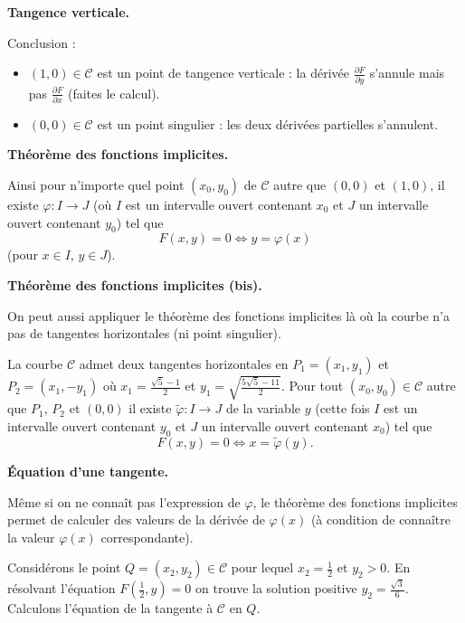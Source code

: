 \documentclass[11pt, class=report,crop=false]{standalone}
\begin{document}
\bigskip

\textbf{Tangence verticale.}

Conclusion :
\begin{itemize}
     \item $(1,0) \in \mathcal{C}$ est un point de tangence verticale : la dérivée $\frac{\partial F}{\partial y}$ s'annule mais pas  $\frac{\partial F}{\partial x}$ (faites le calcul).
     
     \item $(0,0) \in \mathcal{C}$ est un point singulier : les deux dérivées partielles s'annulent.
\end{itemize}

\bigskip


\textbf{Théorème des fonctions implicites.}

Ainsi pour n'importe quel point $(x_0,y_0)$ de $\mathcal{C}$ autre que $(0,0)$ et $(1,0)$, il existe $\varphi :I \to J$ (où $I$ est un intervalle ouvert contenant $x_0$ et $J$ un intervalle ouvert contenant $y_0$) tel que 
$$F(x,y) = 0 \iff y = \varphi(x)$$
(pour $x \in I$, $y \in J$).


\bigskip

\textbf{Théorème des fonctions implicites (bis).}

On peut aussi appliquer le théorème des fonctions implicites là où la courbe n'a pas de tangentes horizontales (ni point singulier).

La courbe $\mathcal{C}$ admet deux tangentes horizontales en $P_1=(x_1,y_1)$ et $P_2=(x_1,-y_1)$ où $x_1 = \frac{\sqrt5-1}{2}$ et $y_1 = \sqrt{\frac{5\sqrt{5}-11}{2}}$.
Pour tout $(x_0,y_0) \in \mathcal{C}$ autre que $P_1$, $P_2$ et $(0,0)$ il existe $\tilde\varphi :I \to J$ de la variable $y$ (cette fois $I$ est un intervalle ouvert contenant $y_0$ et $J$ un intervalle ouvert contenant $x_0$)  tel que 
$$F(x,y) = 0 \iff x = \tilde\varphi(y).$$


\bigskip

\textbf{\'Equation d'une tangente.}
  
Même si on ne connaît pas l'expression de $\varphi$, le théorème des fonctions implicites permet de calculer des valeurs de la dérivée de $\varphi(x)$ (à condition de connaître la valeur $\varphi(x)$ correspondante).

Considérons le point $Q=(x_2,y_2) \in \mathcal{C}$ pour lequel $x_2 = \frac12$ et $y_2>0$.
En résolvant l'équation $F(\frac12,y)=0$ on trouve la solution positive $y_2 = \frac{\sqrt3}{6}$. Calculons l'équation de la tangente à $\mathcal{C}$ en $Q$.
   
\end{document}
